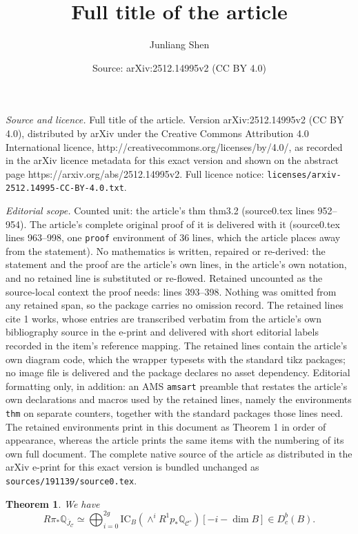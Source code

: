 \documentclass[10pt,a4paper]{amsart}
\title{Full title of the article}
\author{Junliang Shen}
\date{Source: arXiv:2512.14995v2 (CC BY 4.0)}
\newtheorem{thm}{Theorem}
\newcommand{\BQ}{{\mathbb{Q}}}
\newcommand{\CC}{{\mathcal C}}
\begin{document}
\maketitle

\noindent\emph{Source and licence.} Full title of the article. Version arXiv:2512.14995v2 (CC BY 4.0), distributed by arXiv under the Creative Commons Attribution 4.0 International licence, http://creativecommons.org/licenses/by/4.0/, as recorded in the arXiv licence metadata for this exact version and shown on the abstract page https://arxiv.org/abs/2512.14995v2. Full licence notice: \texttt{licenses/arxiv-2512.14995-CC-BY-4.0.txt}.\par\smallskip

\noindent\textit{Editorial scope.} Counted unit: the article's thm thm3.2 (source0.tex lines 952--954). The article's complete original proof of it is delivered with it (source0.tex lines 963--998, one \texttt{proof} environment of 36 lines, which the article places away from the statement). No mathematics is written, repaired or re-derived: the statement and the proof are the article's own lines, in the article's own notation, and no retained line is substituted or re-flowed.  Retained uncounted as the source-local context the proof needs: lines 393--398.  Nothing was omitted from any retained span, so the package carries no omission record.  The retained lines cite 1 works, whose entries are transcribed verbatim from the article's own bibliography source in the e-print and delivered with short editorial labels recorded in the item's reference mapping.  The retained lines contain the article's own diagram code, which the wrapper typesets with the standard tikz packages; no image file is delivered and the package declares no asset dependency.  Editorial formatting only, in addition: an AMS \texttt{amsart} preamble that restates the article's own declarations and macros used by the retained lines, namely the environments \texttt{thm} on separate counters, together with the standard packages those lines need.  The retained environments print in this document as Theorem 1 in order of appearance, whereas the article prints the same items with the numbering of its own full document.  The complete native source of the article as distributed in the arXiv e-print for this exact version is bundled unchanged as \texttt{sources/191139/source0.tex}.
\begin{thm}\label{thm1.1}
We have
\begin{equation}\label{DT_main}
R\pi_* \BQ_{\overline{J}_\CC} \simeq \bigoplus_{i=0}^{2g} \mathrm{IC}_B\left(  \wedge^i R^1p_* \BQ_{{\CC^\circ}}\right)[-i -\dim B] \in D^b_c(B).
    \end{equation}
\end{thm}
\end{document}
